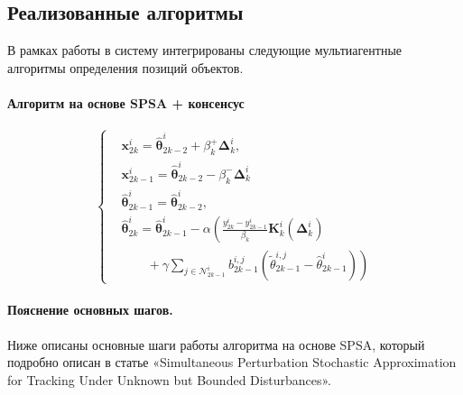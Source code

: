 \subsection{Реализованные алгоритмы}

В рамках работы в систему интегрированы следующие мультиагентные алгоритмы определения позиций объектов.

\paragraph{Алгоритм на основе SPSA + консенсус}


\[
\left\{
\begin{aligned}
  &\mathbf{x}_{2k}^i = \hat{\boldsymbol{\theta}}_{2k-2}^i + \beta_k^+ \boldsymbol{\Delta}_k^i, \\[0.5em]
  &\mathbf{x}_{2k-1}^i = \hat{\boldsymbol{\theta}}_{2k-2}^i - \beta_k^- \boldsymbol{\Delta}_k^i \\[0.5em]
  &\hat{\boldsymbol{\theta}}_{2k-1}^i = \hat{\boldsymbol{\theta}}_{2k-2}^i, \\[0.5em]
  &\hat{\boldsymbol{\theta}}_{2k}^i = \hat{\boldsymbol{\theta}}_{2k-1}^i - \alpha \left( \frac{y_{2k}^i - y_{2k-1}^i}{\beta_k} \mathbf{K}_k^i(\boldsymbol{\Delta}_k^i) \right. \\[0.5em]
  &\qquad \left. {} + \gamma \sum_{j \in \mathcal{N}_{2k-1}^i} b_{2k-1}^{i,j} (\tilde{\theta}_{2k-1}^{i,j} - \hat{\theta}_{2k-1}^i) \right)
\end{aligned}
\right.
\]


\paragraph{Пояснение основных шагов.}

Ниже описаны основные шаги работы алгоритма на основе SPSA, который подробно описан в статье «Simultaneous Perturbation Stochastic Approximation for Tracking Under Unknown but Bounded Disturbances». 

